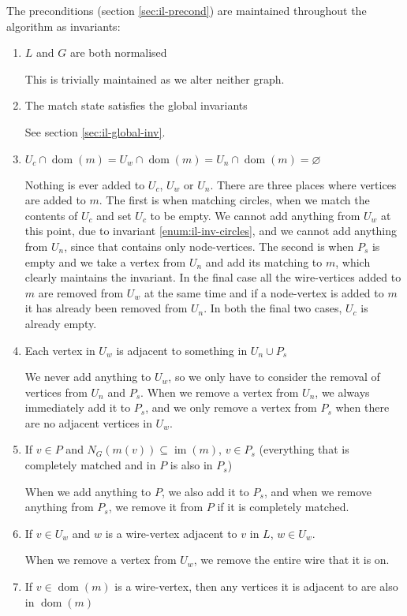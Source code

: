 \documentclass{article}
\DeclareMathOperator{\dom}{dom}
\DeclareMathOperator{\im}{im}
\begin{document}
The preconditions (section \ref{sec:il-precond}) are maintained throughout the algorithm as invariants:

\begin{enumerate}[label=(\roman*),ref=(\roman*)]
  \item $L$ and $G$ are both normalised

  This is trivially maintained as we alter neither graph.
  \item The match state satisfies the global invariants

  See section \ref{sec:il-global-inv}.
  \item $U_c\cap\dom(m) = U_w\cap\dom(m) = U_n\cap\dom(m) = \varnothing$

  Nothing is ever added to $U_c$, $U_w$ or $U_n$.  There are three places where vertices are added to $m$.  The first is when matching circles, when we match the contents of $U_c$ and set $U_c$ to be empty.  We cannot add anything from $U_w$ at this point, due to invariant \ref{enum:il-inv-circles}, and we cannot add anything from $U_n$, since that contains only node-vertices.  The second is when $P_s$ is empty and we take a vertex from $U_n$ and add its matching to $m$, which clearly maintains the invariant.  In the final case all the wire-vertices added to $m$ are removed from $U_w$ at the same time and if a node-vertex is added to $m$ it has already been removed from $U_n$.  In both the final two cases, $U_c$ is already empty.
  \item Each vertex in $U_w$ is adjacent to something in $U_n\cup P_s$

  We never add anything to $U_w$, so we only have to consider the removal of vertices from $U_n$ and $P_s$.  When we remove a vertex from $U_n$, we always immediately add it to $P_s$, and we only remove a vertex from $P_s$ when there are no adjacent vertices in $U_w$.
  \item If $v \in P$ and $N_G(m(v)) \subseteq \im(m)$, $v \in P_s$ (everything that is completely matched and in $P$ is also in $P_s$)

  When we add anything to $P$, we also add it to $P_s$, and when we remove anything from $P_s$, we remove it from $P$ if it is completely matched.
  \item If $v \in U_w$ and $w$ is a wire-vertex adjacent to $v$ in $L$, $w \in U_w$.

  When we remove a vertex from $U_w$, we remove the entire wire that it is on.
  \item If $v \in \dom(m)$ is a wire-vertex, then any vertices it is adjacent to are also in $\dom(m)$


\end{enumerate}
\end{document}
